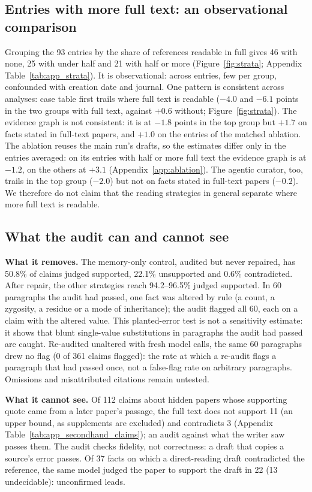 \documentclass{article} %
\begin{document}
\subsection{Entries with more full text: an observational comparison}
\label{sec:strata}
Grouping the 93 entries by the share of references readable in full gives 46 with none, 25 with under half and 21 with half or more (Figure~\ref{fig:strata}; Appendix Table~\ref{tab:app_strata}). It is observational: across entries, few per group, confounded with creation date and journal. One pattern is consistent across analyses: case table first trails where full text is readable ($-4.0$ and $-6.1$ points in the two groups with full text, against $+0.6$ without; Figure~\ref{fig:strata}). The evidence graph is not consistent: it is at $-1.8$ points in the top group but $+1.7$ on facts stated in full-text papers, and $+1.0$ on the entries of the matched ablation. The ablation reuses the main run's drafts, so the estimates differ only in the entries averaged: on its entries with half or more full text the evidence graph is at $-1.2$, on the others at $+3.1$ (Appendix~\ref{app:ablation}). The agentic curator, too, trails in the top group ($-2.0$) but not on facts stated in full-text papers ($-0.2$). We therefore do not claim that the reading strategies in general separate where more full text is readable.

\subsection{What the audit can and cannot see}
\label{sec:audit}
\textbf{What it removes.} The memory-only control, audited but never repaired, has 50.8\% of claims judged supported, 22.1\% unsupported and 0.6\% contradicted. After repair, the other strategies reach 94.2--96.5\% judged supported. In 60 paragraphs the audit had passed, one fact was altered by rule (a count, a zygosity, a residue or a mode of inheritance); the audit flagged all 60, each on a claim with the altered value. This planted-error test is not a sensitivity estimate: it shows that blunt single-value substitutions in paragraphs the audit had passed are caught. Re-audited unaltered with fresh model calls, the same 60 paragraphs drew no flag (0 of 361 claims flagged): the rate at which a re-audit flags a paragraph that had passed once, not a false-flag rate on arbitrary paragraphs. Omissions and misattributed citations remain untested.

\textbf{What it cannot see.} Of 112 claims about hidden papers whose supporting quote came from a later paper's passage, the full text does not support 11 (an upper bound, as supplements are excluded) and contradicts 3 (Appendix Table~\ref{tab:app_secondhand_claims}); an audit against what the writer saw passes them. The audit checks fidelity, not correctness: a draft that copies a source's error passes. Of 37 facts on which a direct-reading draft contradicted the reference, the same model judged the paper to support the draft in 22 (13 undecidable): unconfirmed leads.
\end{document}
